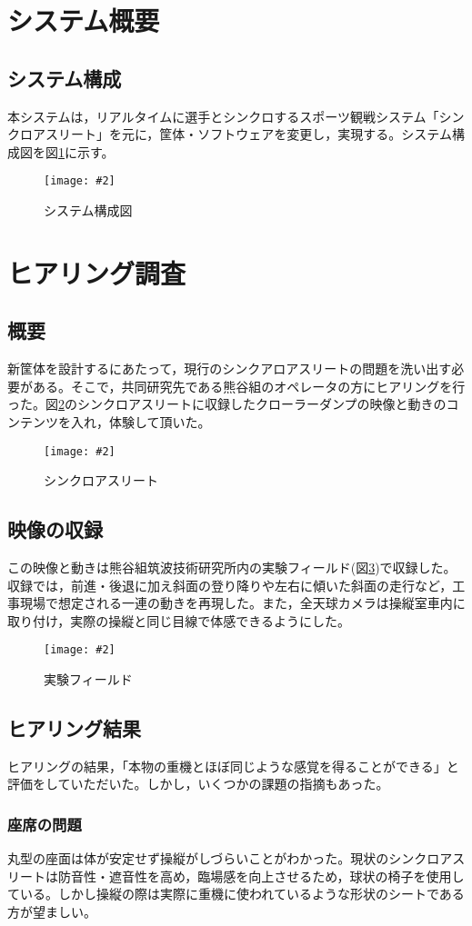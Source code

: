 \documentclass[10pt,a4paper]{jsarticle}
\newcommand{\figuref}[1]{図\ref{#1}}
\newcommand{\fig}[4][width=\textwidth]{
    \begin{figure}[!h]
    \begin{center}
    \texttt{[image: \#2]}
    \caption{#3}
    \label{#4}
    \vspace*{-1cm}
    \end{center}
    \end{figure}
}
\begin{document}
\clearpage

\section{システム概要}
\subsection{システム構成}
本システムは，リアルタイムに選手とシンクロするスポーツ観戦システム「シンクロアスリート」\cite{synchro}を元に，筐体・ソフトウェアを変更し，実現する。システム構成図を\figuref{sys_config}に示す。
\fig{image/sys_config.png}{システム構成図}{sys_config}

\clearpage

\section{ヒアリング調査}
\subsection{概要}
新筐体を設計するにあたって，現行のシンクアロアスリートの問題を洗い出す必要がある。そこで，共同研究先である熊谷組のオペレータの方にヒアリングを行った。\figuref{synchro_image}のシンクロアスリートに収録したクローラーダンプの映像と動きのコンテンツを入れ，体験して頂いた。
\fig[width=9cm]{image/synchro_image.jpg}{シンクロアスリート}{synchro_image}

\subsection{映像の収録}
この映像と動きは熊谷組筑波技術研究所内の実験フィールド(\figuref{test_field})で収録した。収録では，前進・後退に加え斜面の登り降りや左右に傾いた斜面の走行など，工事現場で想定される一連の動きを再現した。また，全天球カメラは操縦室車内に取り付け，実際の操縦と同じ目線で体感できるようにした。
\fig[width=9cm]{image/test_field.jpg}{実験フィールド}{test_field}

\subsection{ヒアリング結果}
ヒアリングの結果，「本物の重機とほぼ同じような感覚を得ることができる」と評価をしていただいた。しかし，いくつかの課題の指摘もあった。

\subsubsection{座席の問題}
丸型の座面は体が安定せず操縦がしづらいことがわかった。現状のシンクロアスリートは防音性・遮音性を高め，臨場感を向上させるため，球状の椅子を使用している。しかし操縦の際は実際に重機に使われているような形状のシートである方が望ましい。
\end{document}
